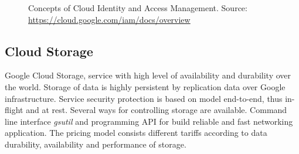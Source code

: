 \documentclass[a4paper,12pt,oneside]{report}
\begin{document}
	\begin{figure}[!htbp]
		\centering
		
		
		\caption[access]{Concepts of Cloud Identity and Access Management. Source: \url{https://cloud.google.com/iam/docs/overview} 
			\centering }
		\label{fig:iam}
	\end{figure}
	
	
	\subsection{Cloud Storage}
	\label{subsub:datastore}
	Google Cloud Storage, service with high level of availability and durability 
	over the world. Storage of data is highly persistent by replication data over
	Google 
	infrastructure. Service security protection is based 
	on model end-to-end, thus in-flight and at rest.  Several ways for controlling
	storage are available. Command 
	line interface \textit{gsutil} and programming API for build 
	reliable and fast networking application. The pricing model consists different
	tariffs 
	according to data durability, availability and performance of storage.
	
\end{document}
